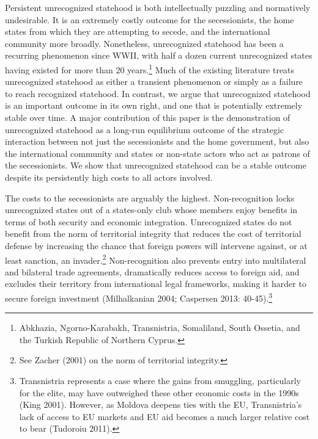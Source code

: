 \documentclass[11pt,letterpaper, notitlepage]{article}
\begin{document}
Persistent unrecognized statehood is both intellectually puzzling and normatively undesirable. It is an extremely costly outcome for the secessionists, the home states from which they are attempting to secede, and the international community more broadly. Nonetheless, unrecognized statehood has been a recurring phenomenon since WWII, with half a dozen current unrecognized states having existed for more than 20 years.\footnote{Abkhazia, Ngorno-Karabakh, Transnistria, Somaliland, South Ossetia, and the Turkish Republic of Northern Cyprus.} Much of the existing literature treats unrecognized statehood as either a transient phenomenon or simply as a failure to reach recognized statehood. In contrast, we argue that unrecognized statehood is an important outcome in its own right, and one that is potentially extremely stable over time. A major contribution of this paper is the demonstration of unrecognized statehood as a long-run equilibrium outcome of the strategic interaction between not just the secessionists and the home government, but also the international community and states or non-state actors who act as patrons of the secessionists. We show that unrecognized statehood can be a stable outcome despite its persistently high costs to all actors involved.

The costs to the secessionists are arguably the highest. Non-recognition locks unrecognized states out of a states-only club whose members enjoy benefits in terms of both security and economic integration. Unrecognized states do not benefit from the norm of territorial integrity that reduces the cost of territorial defense by increasing the chance that foreign powers will intervene against, or at least sanction, an invader.\footnote{See Zacher (2001) on the norm of territorial integrity.} Non-recognition also prevents entry into multilateral and bilateral trade agreements, dramatically reduces access to foreign aid, and excludes their territory from international legal frameworks, making it harder to secure foreign investment (Milhalkanian 2004; Caspersen 2013: 40-45).\footnote{Transnistria represents a case where the gains from smuggling, particularly for the elite, may have outweighed these other economic costs in the 1990s (King 2001). However, as Moldova deepens ties with the EU, Transnistria's lack of access to EU markets and EU aid becomes a much larger relative cost to bear (Tudoroiu 2011).} %
\end{document}
